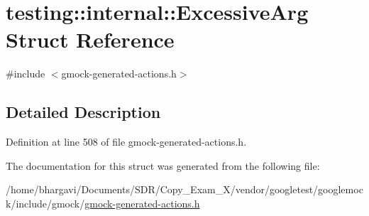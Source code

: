 \hypertarget{structtesting_1_1internal_1_1_excessive_arg}{}\section{testing\+:\+:internal\+:\+:Excessive\+Arg Struct Reference}
\label{structtesting_1_1internal_1_1_excessive_arg}


{\ttfamily \#include $<$gmock-\/generated-\/actions.\+h$>$}



\subsection{Detailed Description}


Definition at line 508 of file gmock-\/generated-\/actions.\+h.



The documentation for this struct was generated from the following file\+:\begin{DoxyCompactItemize}
\item 
/home/bhargavi/\+Documents/\+S\+D\+R/\+Copy\+\_\+\+Exam\+\_\+X/vendor/googletest/googlemock/include/gmock/\hyperlink{gmock-generated-actions_8h}{gmock-\/generated-\/actions.\+h}\end{DoxyCompactItemize}
